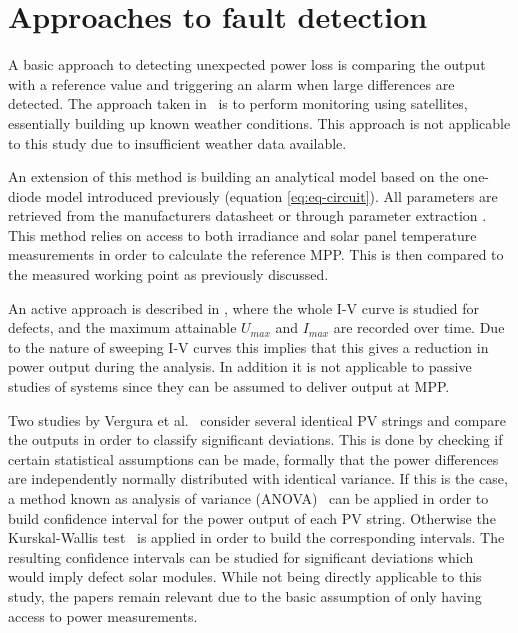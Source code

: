 \clearpage
\section{Approaches to fault detection}
A basic approach to detecting unexpected power loss is comparing the output with a reference value and triggering an alarm when large differences are detected.
The approach taken in~\cite{Stettler2005} is to perform monitoring using satellites, essentially building up known weather conditions.
This approach is not applicable to this study due to insufficient weather data available.

An extension of this method is building an analytical model \cite{Chouder2010,Raina2013,Chao2008}
based on the one-diode model introduced previously (equation \ref{eq:eq-circuit}).
All parameters are retrieved from the manufacturers datasheet or through parameter extraction \cite{Eicker2005,Chouder2009,Walker2001}.
This method relies on access to both irradiance and solar panel temperature measurements in order to calculate the reference MPP.
This is then compared to the measured working point as previously discussed.

An active approach is described in \cite{Meyer2004}, where the whole I-V curve is studied for defects, and the maximum attainable $U_{max}$ and $I_{max}$ are recorded over time.
Due to the nature of sweeping I-V curves this implies that this gives a reduction in power output during the analysis.
In addition it is not applicable to passive studies of systems since they can be assumed to deliver output at MPP.

Two studies by Vergura et al.~\cite{Vergura2008,Vergura2009} consider several identical PV strings and compare the outputs in order to classify significant deviations.
This is done by checking if certain statistical assumptions can be made, formally that the power differences are independently normally distributed with identical variance.
If this is the case, a method known as analysis of variance (ANOVA)~\cite{Vergura2009} can be applied in order to build confidence interval for the power output of each PV string.
Otherwise the Kurskal-Wallis test~\cite{Vergura2009} is applied in order to build the corresponding intervals.
The resulting confidence intervals can be studied for significant deviations which would imply defect solar modules.
While not being directly applicable to this study, the papers remain relevant due to the basic assumption of only having access to power measurements.


